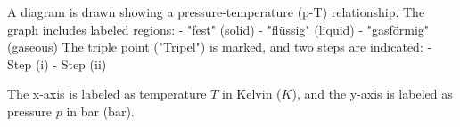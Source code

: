 A diagram is drawn showing a pressure-temperature (p-T) relationship. The graph includes labeled regions:  
- "fest" (solid)  
- "flüssig" (liquid)  
- "gasförmig" (gaseous)  
The triple point ("Tripel") is marked, and two steps are indicated:  
- Step (i)  
- Step (ii)  

The x-axis is labeled as temperature \( T \) in Kelvin (\( K \)), and the y-axis is labeled as pressure \( p \) in bar (\( \text{bar} \)).